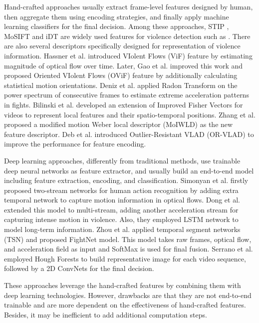 \documentclass[10pt,twocolumn,letterpaper]{article}
\begin{document}
Hand-crafted approaches usually extract frame-level features designed by human, then aggregate them using encoding strategies, and finally apply machine learning classifiers for the final decision.
Among these approaches, STIP \cite{STIPs}, MoSIFT \cite{MoSIFT} and iDT \cite{iDTs} are widely used features for violence detection such as \cite{vio_sift, hockey, mosift_sc}.
There are also several descriptors specifically designed for representation of violence information. 
Hassner et al. \cite{vif} introduced VIolent Flows (ViF) feature by estimating magnitude of optical flow over time.
Later, Gao et al. \cite{ovif} improved this work and proposed Oriented VIolent Flows (OViF) feature by additionally calculating statistical motion orientations.
Deniz et al. \cite{fast} applied Radon Transform on the power spectrum of consecutive frames to estimate extreme acceleration patterns in fights.
Bilinski et al. \cite{bilinski2016human} developed an extension of Improved Fisher Vectors for videos to represent local features and their spatio-temporal positions.
Zhang et al. \cite{MoIWLD} proposed a modified motion Weber local descriptor (MoIWLD) as the new feature descriptor.
Deb et al. \cite{vlad} introduced Outlier-Resistant VLAD (OR-VLAD) to improve the performance for feature encoding.

Deep learning approaches, differently from traditional methods, use trainable deep neural networks as feature extractor, and usually build an end-to-end model including feature extraction, encoding, and classification. 
Simonyan et al. \cite{two-stream} firstly proposed two-stream networks for human action recognition by adding extra temporal network to capture motion information in optical flows.
Dong et al. \cite{dong2016multi} extended this model to multi-stream, adding another acceleration stream for capturing intense motion in violence. Also, they employed LSTM \cite{lstm} network to model long-term information.  
Zhou et al. \cite{zhou2017violent} applied temporal segment networks (TSN) \cite{tsn} and proposed FightNet model. This model takes raw frames, optical flow, and acceleration field as input and SoftMax is used for final fusion.
Serrano et al. \cite{serrano2018fight} employed Hough Forests to build representative image for each video sequence, followed by a 2D ConvNets for the final decision.

These approaches leverage the hand-crafted features by combining them with deep learning technologies.
However, drawbacks are that they are not end-to-end trainable and are more dependent on the effectiveness of hand-crafted features.
Besides, it may be inefficient to add additional computation steps. 
\end{document}
